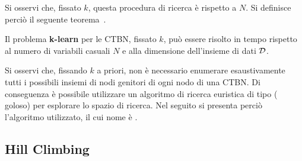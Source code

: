 Si osservi che, fissato $k$, questa procedura di ricerca è  rispetto a $N$. Si definisce perciò il seguente teorema~\citep{Nodelman2002}.
\begin{teorema}
Il problema \textbf{k-learn} per le \acl{CTBN}, fissato $k$, può essere risolto in tempo  rispetto al numero di variabili casuali $N$ e alla dimensione dell'insieme di dati $\mathcal{D}$.
\end{teorema}

Si osservi che, fissando $k$ a priori, non è necessario enumerare esaustivamente tutti i possibili insiemi di nodi genitori di ogni nodo di una \acs{CTBN}. Di conseguenza è possibile utilizzare un algoritmo di ricerca euristica di tipo \emph{} (\ie{} goloso) per esplorare lo spazio di ricerca. Nel seguito si presenta perciò l'algoritmo utilizzato, il cui nome è \emph{}.

\subsection{Hill Climbing}\label{sec:structurallearning-hc}
\omissis{}



